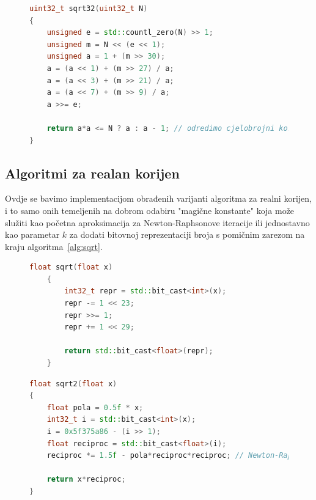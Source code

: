 \documentclass[12pt]{scrartcl}
\begin{document}
\begin{figure}[h]
\begin{lstlisting}[language=C++, label=code:sqrt32, caption=Algoritam za $32$-bitne argumente u C++20~\cite{mdickpaper}]
uint32_t sqrt32(uint32_t N)
{
    unsigned e = std::countl_zero(N) >> 1;
    unsigned m = N << (e << 1);
    unsigned a = 1 + (m >> 30);
    a = (a << 1) + (m >> 27) / a;
    a = (a << 3) + (m >> 21) / a;
    a = (a << 7) + (m >> 9) / a;
    a >>= e;

    return a*a <= N ? a : a - 1; // odredimo cjelobrojni korijen iz skoro-korijena
}
\end{lstlisting}
\end{figure}

\subsection{Algoritmi za realan korijen}
Ovdje se bavimo implementacijom obrađenih varijanti algoritma za realni korijen, i to samo onih temeljenih na dobrom odabiru "magične konstante"
koja može služiti kao početna aproksimacija za Newton-Raphsonove iteracije ili jednostavno kao parametar $k$ za dodati bitovnoj reprezentaciji
broja s pomičnim zarezom na kraju algoritma~\ref{alg:sqrt}.
\begin{figure}[h]
\begin{lstlisting}[language=C++, label=code:sqrt, caption=Direktna aproksimacija realnog korijena u C++20]
    float sqrt(float x)
    {
        int32_t repr = std::bit_cast<int>(x);
        repr -= 1 << 23;
        repr >>= 1;
        repr += 1 << 29;
    
        return std::bit_cast<float>(repr);
    }
\end{lstlisting}
\end{figure}

\begin{figure}[h]
\begin{lstlisting}[language=C++, label=code:invsqrt, caption=Aproksimacija korijena preko recipročne vrijednosti u C++20]
float sqrt2(float x)
{
    float pola = 0.5f * x;
    int32_t i = std::bit_cast<int>(x);
    i = 0x5f375a86 - (i >> 1);
    float reciproc = std::bit_cast<float>(i);
    reciproc *= 1.5f - pola*reciproc*reciproc; // Newton-Raphson iteracija; moguce ponoviti vise puta

    return x*reciproc;
}
\end{lstlisting}
\end{figure}
\end{document}
